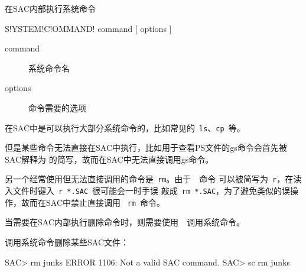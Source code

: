 \label{cmd:systemcommand}

在SAC内部执行系统命令

\begin{SACSTX}
S!YSTEM!C!OMMAND! command [ options ]
\end{SACSTX}

\begin{description}
\item [command] 系统命令名
\item [options] 命令需要的选项
\end{description}

在SAC中是可以执行大部分系统命令的，比如常见的~\verb+ls+、\verb+cp+~等。

但是某些命令无法直接在SAC中执行，比如用于查看PS文件的gs命令会首先被SAC解释为
的简写，故而在SAC中无法直接调用gs命令。

另一个经常使用但无法直接调用的命令是~\verb+rm+。由于~~命令
可以被简写为~\verb+r+，在读入文件时键入~\verb+r *.SAC+~很可能会一时手误
敲成~\verb+rm *.SAC+，为了避免类似的误操作，故而在SAC中禁止直接调用
~\verb+rm+~命令。

当需要在SAC内部执行删除命令时，则需要使用~~调用系统命令。

调用系统命令删除某些SAC文件：
\begin{SACCode}
SAC> rm junks
 ERROR 1106: Not a valid SAC command.
SAC> sc rm junks
\end{SACCode}
